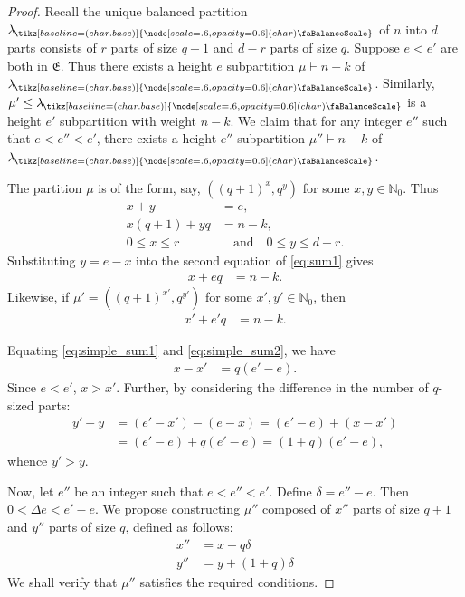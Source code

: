 \documentclass[12pt,dvipsnames,accepted=2016-08-18,a4paper,onecolumn]{quantumarticle}
\def\bal{\tikz[baseline=(char.base)]{
  \node[scale=.6,opacity=0.6] (char) {\faBalanceScale}}
}
\def\lab{\lambda_{\!\bal}}
\numberwithin{equation}{section}
\newcommand{\N}{\mathbb N}
\theoremstyle{definition}
\begin{document}
\begin{proof}
Recall the unique balanced partition $\lab$ of $n$ into $d$ parts consists of $r$ parts of size $q+1$ and $d-r$ parts of size $q$.
Suppose $e<e'$ are both in $\mathfrak E$.
Thus there exists a height $e$ subpartition $\mu\vdash n-k$ of $\lab$. Similarly, $\mu'\leq\lab$ is a height $e'$ subpartition with weight $n-k$.
We claim that for any integer $e''$ such that $e < e'' < e'$, 
there exists a height $e''$ subpartition $\mu''\vdash n-k$ of $\lab$.

The partition $\mu$ is of the form, say, $((q+1)^x,q^y)$ for some $x,y\in\N_0$. Thus
\begin{equation}
\begin{aligned}
    x + y &= e, \\
    x(q+1) + yq &= n-k, \label{eq:sum1} \\
    0 \le x \le r &\quad \text{and} \quad 0 \le y \le d-r.
\end{aligned}
\end{equation}
Substituting $y = e-x$ into the second equation of  \eqref{eq:sum1} gives
\begin{align}
    x + eq &= n- k \label{eq:simple_sum1}.
\end{align}
Likewise,
if $\mu'=((q+1)^{x'},q^{y'})$ for some $x',y'\in\N_0$, then
\begin{align}
    x' + e'q &= n-k \label{eq:simple_sum2}.
\end{align}

Equating \eqref{eq:simple_sum1} and \eqref{eq:simple_sum2}, we have
\begin{align}
    x - x' &= q(e' - e) \label{eq:x_diff}.
\end{align}
Since $e < e'$,  $x > x'$. 
Further, by considering the difference in the number of $q$-sized parts:
\begin{equation}
\begin{aligned}
    y' - y &= (e' - x') - (e - x) = (e' - e) + (x - x') 
    \\
    &= (e' - e) + q(e' - e) 
    = (1+q)(e' - e) \label{eq:y_diff},
\end{aligned}
\end{equation}
whence $y' > y$.

Now, let $e''$ be an integer such that $e < e'' < e'$. Define $\delta  = e'' - e$. Then $0 < \Delta e < e' - e$.
We propose constructing $\mu''$  composed of $x''$ parts of size $q+1$ and $y''$ parts of size $q$, defined as follows:
\begin{equation}
\begin{aligned}
    x'' &= x - q \delta \label{eq:def_x_pp} \\
    y'' &= y + (1+q) \delta 
\end{aligned}
\end{equation}
We shall verify that $\mu''$ satisfies the required conditions.


\end{proof}
\end{document}
